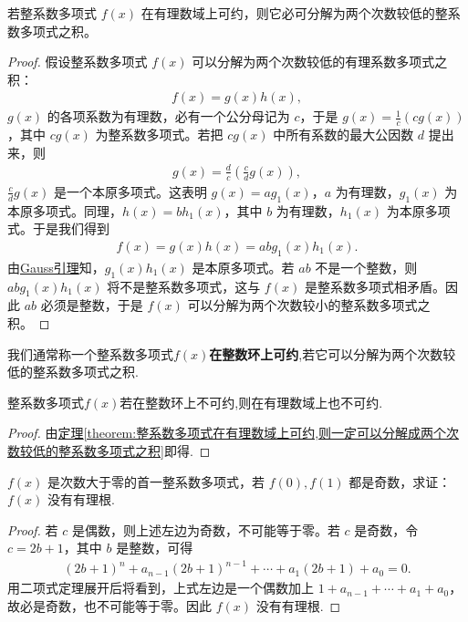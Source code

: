\documentclass[../../main.tex]{subfiles}%
\begin{document}
\begin{theorem}\label{theorem:整系数多项式在有理数域上可约,则一定可以分解成两个次数较低的整系数多项式之积}
若整系数多项式 $f(x)$ 在有理数域上可约，则它必可分解为两个次数较低的整系数多项式之积。
\end{theorem}
\begin{proof}

假设整系数多项式 $f(x)$ 可以分解为两个次数较低的有理系数多项式之积：
\begin{align*}
f(x) = g(x)h(x),
\end{align*}
$g(x)$ 的各项系数为有理数，必有一个公分母记为 $c$，于是 $g(x) = \frac{1}{c}(cg(x))$，其中 $cg(x)$ 为整系数多项式。若把 $cg(x)$ 中所有系数的最大公因数 $d$ 提出来，则
\begin{align*}
g(x) = \frac{d}{c}\left(\frac{c}{d}g(x)\right),
\end{align*}
$\frac{c}{d}g(x)$ 是一个本原多项式。这表明 $g(x) = ag_1(x)$，$a$ 为有理数，$g_1(x)$ 为本原多项式。同理，$h(x) = bh_1(x)$，其中 $b$ 为有理数，$h_1(x)$ 为本原多项式。于是我们得到
\begin{align*}
f(x) = g(x)h(x) = abg_1(x)h_1(x).
\end{align*}
由\hyperref[lemma:Gauss引理]{Gauss引理}知，$g_1(x)h_1(x)$ 是本原多项式。若 $ab$ 不是一个整数，则 $abg_1(x)h_1(x)$ 将不是整系数多项式，这与 $f(x)$ 是整系数多项式相矛盾。因此 $ab$ 必须是整数，于是 $f(x)$ 可以分解为两个次数较小的整系数多项式之积。     

\end{proof}

\begin{definition}[整系数多项式在整数环上可约]
我们通常称一个整系数多项式$f(x)$\textbf{在整数环上可约},若它可以分解为两个次数较低的整系数多项式之积.
\end{definition}

\begin{proposition}\label{proposition:整数环上不可约一定在有理数域上不可约}
整系数多项式$f(x)$若在整数环上不可约,则在有理数域上也不可约.
\end{proposition}
\begin{proof}

由\hyperref[theorem:整系数多项式在有理数域上可约,则一定可以分解成两个次数较低的整系数多项式之积]{定理\ref{theorem:整系数多项式在有理数域上可约,则一定可以分解成两个次数较低的整系数多项式之积}}即得.

\end{proof}

\begin{example}
$f(x)$ 是次数大于零的首一整系数多项式，若 $f(0), f(1)$ 都是奇数，求证：$f(x)$ 没有有理根. 
\end{example}
\begin{proof}

若 $c$ 是偶数，则上述左边为奇数，不可能等于零。若 $c$ 是奇数，令 $c = 2b + 1$，其中 $b$ 是整数，可得
\begin{align*}
(2b + 1)^n + a_{n-1} (2b + 1)^{n-1} + \cdots + a_1 (2b + 1) + a_0 = 0.
\end{align*}
用二项式定理展开后将看到，上式左边是一个偶数加上 $1 + a_{n-1} + \cdots + a_1 + a_0$，故必是奇数，也不可能等于零。因此 $f(x)$ 没有有理根.

\end{proof}
\end{document}

